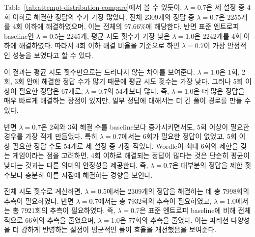 \documentclass[11pt]{article}
\begin{document}
Table~\ref{tab:attempt-distribution-compare}에서 볼 수 있듯이,
$\lambda = 0.7$은 세 설정 중 4회 이하로 해결한 정답의 수가 가장 많았다.
전체 2309개의 정답 중 $\lambda = 0.7$은 2255개를 4회 이하에 해결하였으며,
이는 전체의 97.66\%에 해당한다.
반면 표준 엔트로피 baseline인 $\lambda = 0.5$는 2245개,
평균 시도 횟수가 가장 낮은 $\lambda = 1.0$은 2242개를 4회 이하에 해결하였다.
따라서 4회 이하 해결 비율을 기준으로 하면 $\lambda = 0.7$이 가장 안정적인 성능을 보였다고 할 수 있다.

이 결과는 평균 시도 횟수만으로는 드러나지 않는 차이를 보여준다.
$\lambda = 1.0$은 1회, 2회, 3회 안에 해결한 정답 수가 많기 때문에 평균 시도 횟수는 가장 낮다.
그러나 5회 이상이 필요한 정답은 67개로, $\lambda = 0.7$의 54개보다 많다.
즉, $\lambda = 1.0$은 더 많은 정답을 매우 빠르게 해결하는 장점이 있지만,
일부 정답에 대해서는 더 긴 풀이 경로를 만들 수 있다.

반면 $\lambda = 0.7$은 2회와 3회 해결 수를 baseline보다 증가시키면서도,
5회 이상이 필요한 경우를 가장 적게 만들었다.
특히 $\lambda = 0.7$에서는 6회가 필요한 정답이 없었고,
5회 이상 필요한 정답 수도 54개로 세 설정 중 가장 적었다.
Wordle이 최대 6회의 제한을 갖는 게임이라는 점을 고려하면,
4회 이하로 해결되는 정답이 많다는 것은 단순히 평균이 낮다는 것과는 다른 의미의 안정성을 제공한다.
즉, $\lambda = 0.7$은 대부분의 정답을 제한 횟수보다 충분히 이른 시점에 해결하는 경향을 보인다.

전체 시도 횟수로 계산하면, $\lambda = 0.5$에서는 2309개의 정답을 해결하는 데 총 7998회의 추측이 필요하였다.
반면 $\lambda = 0.7$에서는 총 7932회의 추측이 필요하였고,
$\lambda = 1.0$에서는 총 7921회의 추측이 필요하였다.
즉, $\lambda = 0.7$은 표준 엔트로피 baseline에 비해 전체적으로 66회의 추측을 줄였으며,
$\lambda = 1.0$은 77회의 추측을 줄였다.
이는 파티션 다양성을 더 강하게 반영하는 설정이 평균적인 풀이 효율을 개선했음을 보여준다.
\end{document}
